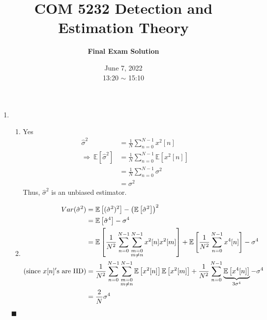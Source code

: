 \documentclass[a4paper,12pt]{article}
\title{\textbf{COM 5232 Detection and Estimation Theory}}
\author{\textbf{Final Exam Solution}}
\date{June 7, 2022\\
13:20 $\sim$ 15:10
}
\begin{document}
    \maketitle
    \begin{enumerate}
        \item
            \begin{enumerate}
                \item Yes
                    \begin{align*}
                    \hat\sigma^2 &=\frac{1}{N}\sum\limits_{n=0}^{N-1}x^2[n]\\
                    \Longrightarrow\ \mathbb E[\hat\sigma^2]&=\frac{1}{N}\sum\limits_{n=0}^{N-1}\mathbb E\left[x^2[n]\right]\\
                    &=\frac{1}{N}\sum\limits_{n=0}^{N-1}\sigma^2\\
                    &=\sigma^2
                    \end{align*}
                    Thus, $\hat\sigma^2$ is an unbiased estimator.
                \item
                    \begin{align*}
                        Var(\hat\sigma^2) &= \mathbb E\left[(\hat\sigma^2)^2\right]- \left(\mathbb E\left[\hat\sigma^2\right]\right)^2\\
                        &= \mathbb E\left[\hat\sigma^4\right]-\sigma^4\\
                        &= \mathbb E\left[\frac{1}{N^2}\sum\limits_{n=0}^{N-1}\sum\limits_{\substack{m=0 \\ m \neq n}}^{N-1}x^2[n]x^2[m]\right]+\mathbb E\left[\frac{1}{N^2}\sum\limits_{n=0}^{N-1}x^4[n]\right]-\sigma^4\\
                        ({\rm since}\ x[n]{\rm 's}\ {\rm are\ IID})&= \frac{1}{N^2}\sum\limits_{n=0}^{N-1}\sum\limits_{\substack{m=0 \\ m \neq n}}^{N-1}\mathbb E\left[x^2[n]\right]\mathbb E\left[x^2[m]\right]+\frac{1}{N^2}\sum\limits_{n=0}^{N-1}\underbrace{\mathbb E\left[x^4[n]\right]}_{3\sigma^4}-\sigma^4\\
                        &=\frac{2}{N}\sigma^4
                    \end{align*}
            \end{enumerate}
            \begin{flushright}
                $\blacksquare$
            \end{flushright}
        

\end{enumerate}
\end{document}
